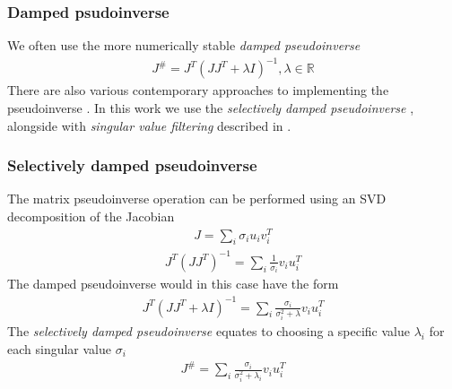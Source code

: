 \documentclass[times, utf8, diplomski, english]{fer}
\begin{document}
\subsubsection{Damped psudoinverse}
We often use the more numerically stable \textit{damped pseudoinverse} \citep{chan1988general}
\begin{align}
J^{\#} = J^T\left(JJ^T + \lambda I\right)^{-1} ,  \lambda \in \mathbb{R}
\end{align}
There are also various contemporary approaches to implementing the pseudoinverse \citep{chiaverini1994review}. 
In this work we use the \textit{selectively damped pseudoinverse} \citep{buss2005selectively}, alongside with \textit{singular value filtering} described in \citep{colome2015closed}.
\subsubsection{Selectively damped pseudoinverse}
The matrix pseudoinverse operation can be performed using an SVD decomposition of the Jacobian
\begin{align}
J = \sum\limits_{i}{\sigma_{i}u_iv_i^T}
\end{align}
\begin{align}
J^T\left(JJ^T\right)^{-1} = \sum\limits_{i}{\frac{1}{\sigma_{i}}v_iu_i^T}
\end{align}
The damped pseudoinverse would in this case have the form 
\begin{align}
J^T\left(JJ^T + \lambda I\right)^{-1} = \sum\limits_{i}{\frac{\sigma_{i}}{\sigma_{i}^2 + \lambda}v_iu_i^T}
\end{align}
The \textit{selectively damped pseudoinverse} \citep{buss2005selectively} equates to choosing a specific value $\lambda_i$ for each singular value $\sigma_i$
\begin{align}\label{eq:sdp}
J^{\#} = \sum\limits_{i}{\frac{\sigma_{i}}{\sigma_{i}^2 + \lambda_i}v_iu_i^T}
\end{align}
\end{document}
